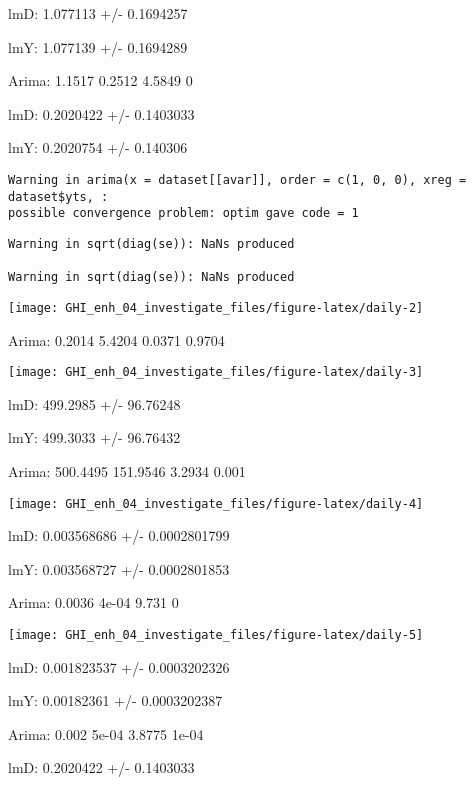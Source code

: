 \documentclass[
  10pt,
  a4paper,oneside]{article}
\begin{document}
lmD: 1.077113 +/- 0.1694257

lmY: 1.077139 +/- 0.1694289

Arima: 1.1517 0.2512 4.5849 0

lmD: 0.2020422 +/- 0.1403033

lmY: 0.2020754 +/- 0.140306

\begin{verbatim}
Warning in arima(x = dataset[[avar]], order = c(1, 0, 0), xreg = dataset$yts, :
possible convergence problem: optim gave code = 1
\end{verbatim}

\begin{verbatim}
Warning in sqrt(diag(se)): NaNs produced

Warning in sqrt(diag(se)): NaNs produced
\end{verbatim}

\begin{center}\texttt{[image: GHI\_enh\_04\_investigate\_files/figure-latex/daily-2]} \end{center}

Arima: 0.2014 5.4204 0.0371 0.9704

\begin{center}\texttt{[image: GHI\_enh\_04\_investigate\_files/figure-latex/daily-3]} \end{center}

lmD: 499.2985 +/- 96.76248

lmY: 499.3033 +/- 96.76432

Arima: 500.4495 151.9546 3.2934 0.001

\begin{center}\texttt{[image: GHI\_enh\_04\_investigate\_files/figure-latex/daily-4]} \end{center}

lmD: 0.003568686 +/- 0.0002801799

lmY: 0.003568727 +/- 0.0002801853

Arima: 0.0036 4e-04 9.731 0

\begin{center}\texttt{[image: GHI\_enh\_04\_investigate\_files/figure-latex/daily-5]} \end{center}

lmD: 0.001823537 +/- 0.0003202326

lmY: 0.00182361 +/- 0.0003202387

Arima: 0.002 5e-04 3.8775 1e-04

lmD: 0.2020422 +/- 0.1403033
\end{document}
